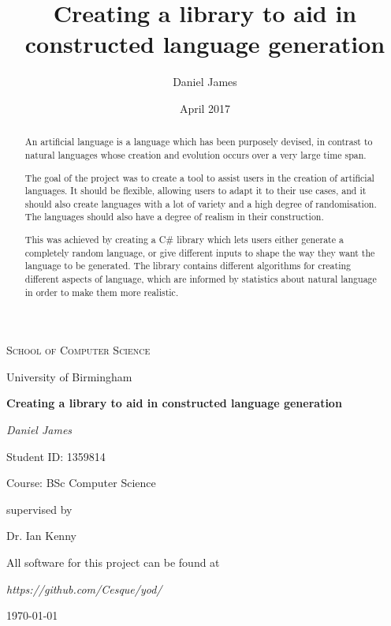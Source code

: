 \documentclass{report}
\title{Creating a library to aid in constructed language generation}
\author{Daniel James}
\date{April 2017}
\newcommand{\Csh}{C{\lserif\#}}
\begin{document}
	\begin{titlepage}
	  	\centering
	  	{\scshape\LARGE School of Computer Science\par University of Birmingham \par}
	  	\vspace{4cm}
	  	{\huge\bfseries Creating a library to aid in constructed language generation\par}
	  	\vspace{0.3cm}
	  	{\Large\itshape Daniel James\par}
	  	{\small Student ID: 1359814\par}
	  	{\small Course: BSc Computer Science\par}
	  	\vfill
	  	supervised by\par
	  	Dr. Ian Kenny
	  	
	  	\vspace{0.8cm}
	  		
	  	All software for this project can be found at\par\textit{https://github.com/Cesque/yod/}\par
	  	\vspace{0.8cm}
	  	{\large \today\par}
	\end{titlepage}
	
	\begin{abstract}
		An artificial language is a language which has been purposely devised, in contrast to natural languages whose creation and evolution occurs over a very large time span.
		
		The goal of the project was to create a tool to assist users in the creation of artificial languages. It should be flexible, allowing users to adapt it to their use cases, and it should also create languages with a lot of variety and a high degree of randomisation. The languages should also have a degree of realism in their construction.
		
		This was achieved by creating a \Csh{} library which lets users either generate a completely random language, or give different inputs to shape the way they want the language to be generated. The library contains different algorithms for creating different aspects of language, which are informed by statistics about natural language in order to make them more realistic.
	\end{abstract}
	
	\tableofcontents
	
	\listoffigures
	
\end{document}
